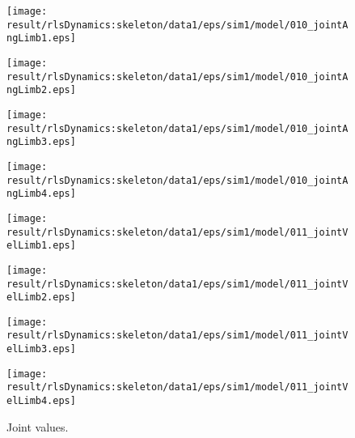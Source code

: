 \begin{figure}[h]
\centering
\begin{minipage}{0.240000\linewidth}
\centering
\texttt{[image: \\result/rlsDynamics:skeleton/data1/eps/sim1/model/010\_jointAngLimb1.eps]}
\par\footnotesize{}
\end{minipage}
\begin{minipage}{0.240000\linewidth}
\centering
\texttt{[image: \\result/rlsDynamics:skeleton/data1/eps/sim1/model/010\_jointAngLimb2.eps]}
\par\footnotesize{}
\end{minipage}
\begin{minipage}{0.240000\linewidth}
\centering
\texttt{[image: \\result/rlsDynamics:skeleton/data1/eps/sim1/model/010\_jointAngLimb3.eps]}
\par\footnotesize{}
\end{minipage}
\begin{minipage}{0.240000\linewidth}
\centering
\texttt{[image: \\result/rlsDynamics:skeleton/data1/eps/sim1/model/010\_jointAngLimb4.eps]}
\par\footnotesize{}
\end{minipage}
\begin{minipage}{0.240000\linewidth}
\centering
\texttt{[image: \\result/rlsDynamics:skeleton/data1/eps/sim1/model/011\_jointVelLimb1.eps]}
\par\footnotesize{}
\end{minipage}
\begin{minipage}{0.240000\linewidth}
\centering
\texttt{[image: \\result/rlsDynamics:skeleton/data1/eps/sim1/model/011\_jointVelLimb2.eps]}
\par\footnotesize{}
\end{minipage}
\begin{minipage}{0.240000\linewidth}
\centering
\texttt{[image: \\result/rlsDynamics:skeleton/data1/eps/sim1/model/011\_jointVelLimb3.eps]}
\par\footnotesize{}
\end{minipage}
\begin{minipage}{0.240000\linewidth}
\centering
\texttt{[image: \\result/rlsDynamics:skeleton/data1/eps/sim1/model/011\_jointVelLimb4.eps]}
\par\footnotesize{}
\end{minipage}

\caption{Joint values.}
\end{figure}
